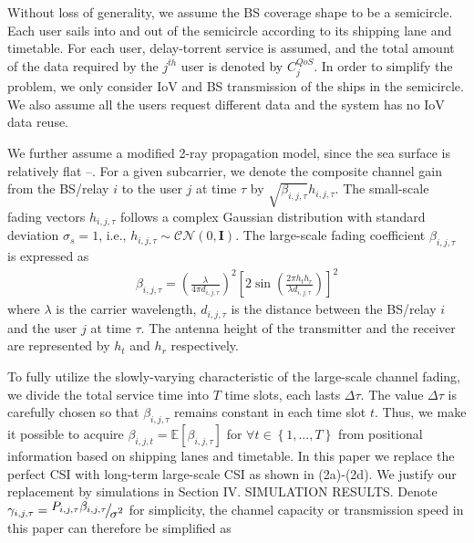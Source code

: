 \documentclass{ieeeaccess}
\begin{document}
Without loss of generality, we assume the BS coverage shape to be a semicircle. 
Each user sails into and out of the semicircle according to its shipping lane and timetable. For each user, delay-torrent service is assumed, and the total amount of the data required by the ${j^{th}}$ user is denoted by $C_j^{QoS}$. In order to simplify the problem, we only consider IoV and BS transmission of the ships in the semicircle. We also assume all the users request different data and the system has no IoV data reuse.

We further assume a modified 2-ray propagation model, since the sea surface is relatively flat \cite{p0}--\cite{p2}. For a given subcarrier, we denote the composite channel gain from the BS/relay $i$ to the user $j$ at time $\tau $ by $\sqrt {{\beta _{i,j,\tau }}} {h_{i,j,\tau }}$. The small-scale fading vectors ${h_{i,j,\tau }}$ follows a complex Gaussian distribution with standard deviation ${\sigma _s} = 1$, i.e., ${h_{i,j,\tau }} \sim \mathcal{CN}(0, \mathbf{I})$. The large-scale fading coefficient ${\beta _{i,j,\tau }}$ is expressed as
\begin{align}
{\beta _{i,j,\tau }} = {\left( {\frac{\lambda }{{4\pi {d_{i,j,\tau }}}}} \right)^2}{\left[ {2\sin \left( {\frac{{2\pi {h_t}{h_r}}}{{\lambda {d_{i,j,\tau }}}}} \right)} \right]^2}
\end{align}
where $\lambda $ is the carrier wavelength, ${d_{i,j,\tau }}$ is the distance between the BS/relay $i$ and the user $j$ at time $\tau $. The antenna height of the transmitter and the receiver are represented by $h_t$ and $h_r$ respectively.

To fully utilize the slowly-varying characteristic of the large-scale channel fading, we divide the total service time into $T$ time slots, each lasts $\Delta \tau$. The value $\Delta \tau$ is carefully chosen so that $\beta _{i,j,\tau }$ remains constant in each time slot $t$. Thus, we make it possible to acquire $\beta _{i,j,t} = \mathbb{E} \left [ {\beta _{i,j,\tau }} \right ]$ for $\forall t \in \left\{ {1,...,T} \right\}$ from positional information based on shipping lanes and timetable. 
In this paper we replace the perfect CSI with long-term large-scale CSI \cite{p41} as shown in (2a)-(2d). We justify our replacement by simulations in Section IV. SIMULATION RESULTS. Denote ${\gamma _{i,j,\tau }} = {\raise0.7ex\hbox{${{P_{i,j,\tau }}{\beta _{i,j,\tau }}}$} \!\mathord{\left/
 {\vphantom {{{P_{i,j,\tau }}{\beta _{i,j,\tau }}} {{\sigma ^2}}}}\right.\kern-\nulldelimiterspace}
\!\lower0.7ex\hbox{${{\sigma ^2}}$}}$ for simplicity, the channel capacity or transmission speed in this paper can therefore be simplified as
\end{document}
